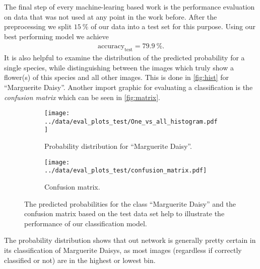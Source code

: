 The final step of every machine-learing based work is the performance evaluation on data that was not used at any point in the work before.
After the preprocessing we split $\SI{15}{\percent}$ of our data into a test set for this purpose.
Using our best performing model we achieve
\begin{align}
    \text{accuracy}_\text{test} = \SI{79.9}{\percent}.
\end{align}
It is also helpful to examine the distribution of the predicted probability for a single species, while distinguishing between the images which truly show a flower(s) of this species and
all other images.
This is done in \autoref{fig:hist} for \enquote{Marguerite Daisy}.
Another import graphic for evaluating a classification is the \textit{confusion matrix} which can be seen in \autoref{fig:matrix}.
\begin{figure}
    \centering    
    \begin{subfigure}{0.49\textwidth}
        \centering
        \texttt{[image: ../data/eval\_plots\_test/One\_vs\_all\_histogram.pdf]}
        \caption{Probability distribution for \enquote{Marguerite Daisy}.}
        \label{fig:hist}
    \end{subfigure}
    \hfill
    \begin{subfigure}{0.49\textwidth}
        \centering
        \texttt{[image: ../data/eval\_plots\_test/confusion\_matrix.pdf]}
        \caption{Confusion matrix.}
        \label{fig:matrix}
    \end{subfigure}
    \caption{The predicted probabilities for the class \enquote{Marguerite Daisy} and the confusion matrix based on the test data set help to illustrate the performance of our classification model.}
\end{figure}
The probability distribution shows that out network is generally pretty certain in its classification of Marguerite Daisys, as most images (regardless if correctly classified or not) 
are in the highest or lowest bin.


